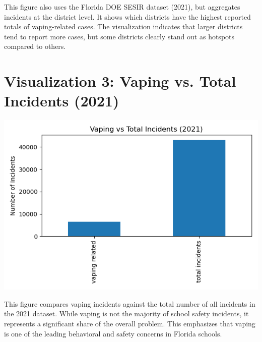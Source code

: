 \documentclass{article}
\begin{document}
This figure also uses the Florida DOE SESIR dataset (2021), 
but aggregates incidents at the district level. 
It shows which districts have the highest reported totals of vaping-related cases. 
The visualization indicates that larger districts tend to report more cases, 
but some districts clearly stand out as hotspots compared to others.

\section*{Visualization 3: Vaping vs. Total Incidents (2021)}
\includegraphics[width=0.7\linewidth]{vaping_vs_total.png}
\vspace{0.5cm}

This figure compares vaping incidents against the total number of all incidents 
in the 2021 dataset. While vaping is not the majority of school safety incidents, 
it represents a significant share of the overall problem. 
This emphasizes that vaping is one of the leading behavioral and safety concerns 
in Florida schools.
\end{document}
